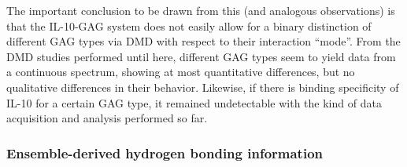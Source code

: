 The important conclusion to be drawn from this (and analogous observations) is
that the IL-10-GAG system does not easily allow for a binary distinction of
different GAG types via DMD with respect to their interaction \enquote{mode}.
From the DMD studies performed until here, different GAG types seem to yield
data from a continuous spectrum, showing at most quantitative differences, but
no qualitative differences in their behavior. Likewise, if there is binding
specificity of IL-10 for a certain GAG type, it remained undetectable with the
kind of data acquisition and analysis performed so far.

\subsubsection{Ensemble-derived hydrogen bonding information}


